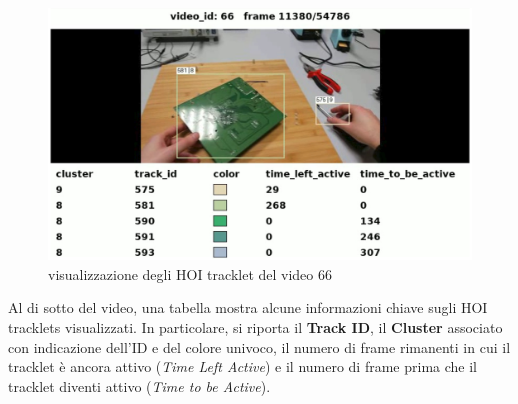 \begin{figure}[ht]
    \centering
    \includegraphics[width=1\linewidth]{Images/amego_video.jpg}
    \caption{visualizzazione degli HOI tracklet del video 66 }
    \label{fig:amego_video}
\end{figure}

Al di sotto del video, una tabella mostra alcune informazioni chiave sugli HOI tracklets visualizzati. In particolare, si riporta il \textbf{Track ID}, il \textbf{Cluster} associato con indicazione dell'ID e del colore univoco, il numero di frame rimanenti in cui il tracklet è ancora attivo (\textit{Time Left Active}) e il numero di frame prima che il tracklet diventi attivo (\textit{Time to be Active}).